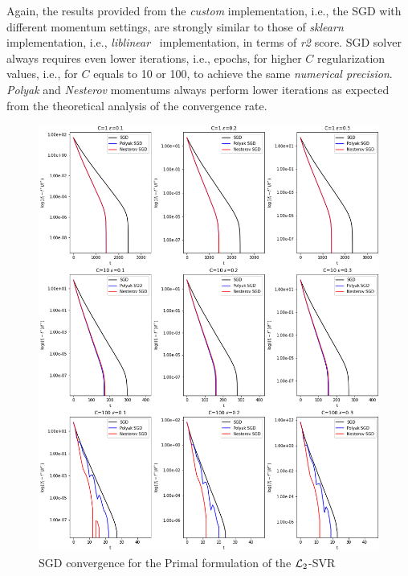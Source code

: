 

Again, the results provided from the \emph{custom} implementation, i.e., the SGD with different momentum settings, are strongly similar to those of \emph{sklearn} implementation, i.e., \emph{liblinear}~\cite{fan2008liblinear} implementation, in terms of \emph{r2} score. SGD solver always requires even lower iterations, i.e., epochs, for higher $C$ regularization values, i.e., for $C$ equals to 10 or 100, to achieve the same \emph{numerical precision}. \emph{Polyak} and \emph{Nesterov} momentums always perform lower iterations as expected from the theoretical analysis of the convergence rate.

\begin{figure}[H]
	\centering
	\includegraphics[scale=0.5]{img/l2_svr_loss_history}
	\caption{SGD convergence for the Primal formulation of the $\protect \mathcal{L}_2$-SVR}
	\label{fig:l2_svr_loss_history}
\end{figure}

\pagebreak

